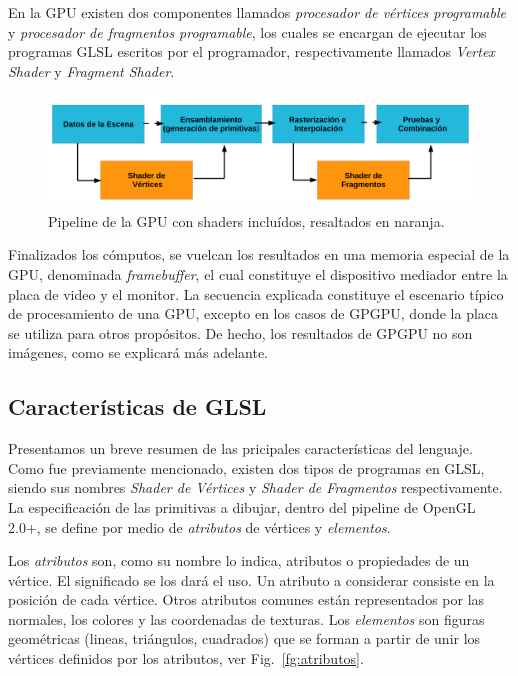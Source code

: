 En la GPU existen dos componentes llamados {\em procesador de v\'ertices programable} y {\em procesador de fragmentos programable}, los cuales se encargan de ejecutar los programas GLSL escritos por el programador, respectivamente llamados {\em Vertex Shader} y {\em Fragment Shader}.

\begin{figure}[h]
\begin{center}
\includegraphics[width=13cm]{figures/pipelinegrafico}
\end{center}
\caption[Pipeline de la GPU con shaders incluídos]{Pipeline de la GPU con shaders incluídos, resaltados en naranja.}
\label{fg:pipelinegrafico}
\end{figure}

Finalizados los cómputos, se vuelcan los resultados en una memoria especial de la GPU, denominada {\em framebuffer}, el cual constituye el dispositivo mediador entre la placa de video y el monitor.
La secuencia explicada constituye el escenario típico de procesamiento de una GPU, excepto en los casos de GPGPU, donde la placa se utiliza para otros propósitos.
De hecho, los resultados de GPGPU no son imágenes, como se explicará más adelante.


\subsection{Características de GLSL}
Presentamos un breve resumen de las pricipales caracter\'isticas del lenguaje.
Como fue previamente mencionado, existen dos tipos de programas en GLSL, siendo sus nombres {\em Shader de Vértices} y {\em Shader de Fragmentos} respectivamente.
La especificación de las primitivas a dibujar, dentro del pipeline de OpenGL 2.0+, se define por medio de {\em atributos} de vértices y {\em elementos}. 


Los \emph{atributos} son, como su nombre lo indica, atributos o propiedades de un vértice.
El significado se los dará el uso.
Un atributo a considerar consiste en la posición de cada vértice.
Otros atributos comunes están representados por las normales, los colores y las coordenadas de texturas.
Los \emph{elementos} son figuras geométricas (lineas, triángulos, cuadrados) que se forman a partir de unir los vértices definidos por los atributos, ver Fig.~\ref{fg:atributos}.

